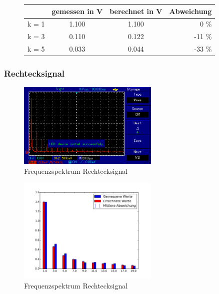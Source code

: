 \begin{figure}[h!]
	\centering
	\begin{tabular}{c|ccr}
		& gemessen in V & berechnet in V & Abweichung \\
		\hline
		k =	1 & 1.100   & 1.100      &  0 \%       \\
		k =	3 & 0.110  & 0.122 & -11 \% \\
		k =	5 & 0.033 & 0.044    & -33 \% \\
	\end{tabular}
	\label{tab:Dreieck}
\end{figure}
\clearpage



\subsubsection{Rechtecksignal}


\begin{figure}[h!]
	\centering
	\includegraphics[width=0.6\textwidth]{Rechteck.png}
	\caption{Frequenzspektrum Rechtecksignal}
	\label{Frequenz_Rechteck}
\end{figure}

\begin{figure}[h!]
	\centering
	\includegraphics[width=0.6\textwidth]{Rechteck_Fourier.pdf}
	\caption{Frequenzspektrum Rechtecksignal}
	\label{Fourier_Rechteck}
\end{figure}

